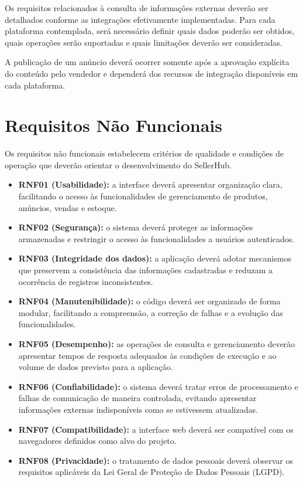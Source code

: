 Os requisitos relacionados à consulta de informações externas deverão ser detalhados conforme as integrações efetivamente implementadas. Para cada plataforma contemplada, será necessário definir quais dados poderão ser obtidos, quais operações serão suportadas e quais limitações deverão ser consideradas.

A publicação de um anúncio deverá ocorrer somente após a aprovação explícita do conteúdo pelo vendedor e dependerá dos recursos de integração disponíveis em cada plataforma.

\section{Requisitos Não Funcionais}

Os requisitos não funcionais estabelecem critérios de qualidade e condições de operação que deverão orientar o desenvolvimento do SellerHub.

\begin{itemize}
    \item \textbf{RNF01 (Usabilidade):} a interface deverá apresentar organização clara, facilitando o acesso às funcionalidades de gerenciamento de produtos, anúncios, vendas e estoque.
    \item \textbf{RNF02 (Segurança):} o sistema deverá proteger as informações armazenadas e restringir o acesso às funcionalidades a usuários autenticados.
    \item \textbf{RNF03 (Integridade dos dados):} a aplicação deverá adotar mecanismos que preservem a consistência das informações cadastradas e reduzam a ocorrência de registros inconsistentes.
    \item \textbf{RNF04 (Manutenibilidade):} o código deverá ser organizado de forma modular, facilitando a compreensão, a correção de falhas e a evolução das funcionalidades.
    \item \textbf{RNF05 (Desempenho):} as operações de consulta e gerenciamento deverão apresentar tempos de resposta adequados às condições de execução e ao volume de dados previsto para a aplicação.
    \item \textbf{RNF06 (Confiabilidade):} o sistema deverá tratar erros de processamento e falhas de comunicação de maneira controlada, evitando apresentar informações externas indisponíveis como se estivessem atualizadas.
    \item \textbf{RNF07 (Compatibilidade):} a interface web deverá ser compatível com os navegadores definidos como alvo do projeto.
    \item \textbf{RNF08 (Privacidade):} o tratamento de dados pessoais deverá observar os requisitos aplicáveis da Lei Geral de Proteção de Dados Pessoais (LGPD).
\end{itemize}

